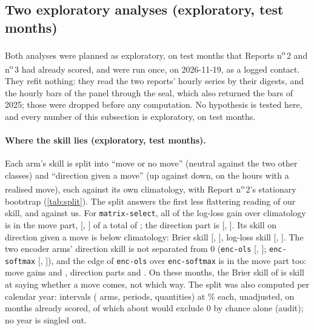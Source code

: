 \documentclass[11pt]{article}
\newcommand{\code}[1]{\texttt{#1}}
\newcommand{\pct}{\%}
\begin{document}
\subsection{Two exploratory analyses (exploratory, test months)}\label{sec:case-explore}
Both analyses were planned as exploratory, on test months that Reports n\textsuperscript{o}\,2 and
n\textsuperscript{o}\,3 had already scored, and were run once, on 2026-11-19, as a logged contact.
They refit nothing: they read the two reports' hourly series by their digests, and the hourly bars
of the panel through the seal, which also returned the bars of 2025; those were dropped before any
computation. No hypothesis is tested here, and every number of this subsection is exploratory, on
test months.

\paragraph{Where the skill lies (exploratory, test months).} Each arm's skill is split into
``move or no move'' (neutral against the two other classes) and ``direction given a move'' (up
against down, on the hours with a realised move), each against its own climatology, with Report
n\textsuperscript{o}\,2's stationary bootstrap (\cref{tab:split}). The split answers the first less
flattering reading of our skill, and against us. For \code{matrix-select}, all of the log-loss gain
over climatology is in the move part, \NumSpMsGainMove{} [\NumSpMsGainMoveLo, \NumSpMsGainMoveHi]
of a total of \NumSpMsGainTotal; the direction part is \NumSpMsGainDir{} [\NumSpMsGainDirLo,
\NumSpMsGainDirHi]. Its skill on direction given a move is below climatology: Brier skill
\NumSpMsDir{} [\NumSpMsDirLo, \NumSpMsDirHi], log-loss skill \NumSpMsDirLl{} [\NumSpMsDirLlLo,
\NumSpMsDirLlHi]. The two encoder arms' direction skill is not separated from 0 (\code{enc-ols}
\NumSpEoDir{} [\NumSpEoDirLo, \NumSpEoDirHi]; \code{enc-softmax} \NumSpEsDir{} [\NumSpEsDirLo,
\NumSpEsDirHi]), and the edge of \code{enc-ols} over \code{enc-softmax} is in the move part too:
move gains \NumSpEoGainMove{} and \NumSpEsGainMove, direction parts \NumSpEoGainDir{} and
\NumSpEsGainDir. On these months, the Brier skill of \NumSpMsThree{} is skill at saying whether a
move comes, not which way. The split was also computed per calendar year: \NumSplitIntervals{}
intervals (\NumSplitArms{} arms, \NumSplitPeriods{} periods, \NumSplitQuantities{} quantities) at
\NumConf\pct{} each, unadjusted, on months already scored, of which about \NumSplitChance{} would
exclude 0 by chance alone (audit); no year is singled out.
\end{document}
